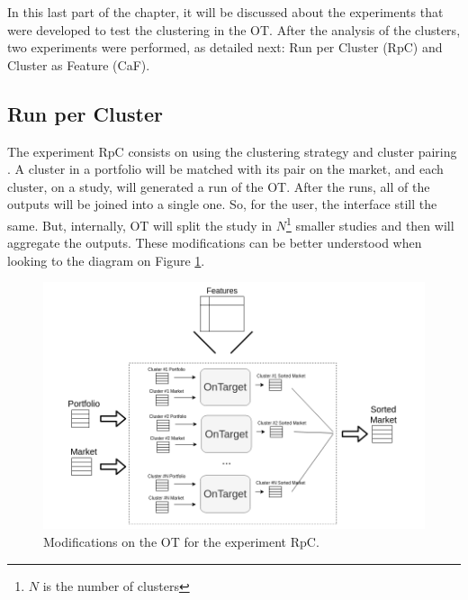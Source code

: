 \newcommand{\fullNameExperimentI}{Run per Cluster}
\newcommand{\nameExperimentI}{RpC}
\newcommand{\fullNameExperimentII}{Cluster as Feature}
\newcommand{\nameExperimentII}{CaF}


In this last part of the chapter, it will be discussed about the experiments that were developed to test the clustering in the OT. After the analysis of the clusters, two experiments were performed, as detailed next: \fullNameExperimentI{} (\nameExperimentI{}) and \fullNameExperimentII{} (\nameExperimentII{}).

\subsection{\fullNameExperimentI{}}
\label{ch:experiment-i}

The experiment \nameExperimentI{} consists on using the clustering strategy \nameClusterStrategyA{} and cluster pairing \nameClusterPairingA{}. A cluster in a portfolio will be matched with its pair on the market, and each cluster, on a study, will generated a run of the OT. After the runs, all of the outputs will be joined into a single one. So, for the user, the interface still the same. But, internally, OT will split the study in $N$\footnote{$N$ is the number of clusters} smaller studies and then will aggregate the outputs. These modifications can be better understood when looking to the diagram on Figure \ref{fig:one-run-each-cluster}. 

\begin{figure}[h]
   \centering
   \includegraphics[width=\linewidth]{fig/ch3-one-run-each-cluster.png}
   \caption{Modifications on the OT for the experiment \nameExperimentI{}.}
   \label{fig:one-run-each-cluster}
\end{figure}

